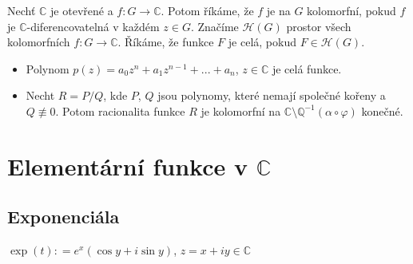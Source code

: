 
\begin{definition}
Nechť $\mathbb{C}$ je otevřené a $f \colon G \to \mathbb{C}$.
Potom říkáme, že $f$ je na $G$ kolomorfní, pokud $f$ je  $\mathbb{C}$-diferencovatelná v každém $z\in {G}$. Značíme $\mathcal{H}(G)$ prostor všech kolomorfních $f \colon G \to \mathbb{C}$. Říkáme, že funkce $F$ je celá, pokud $F\in \mathcal{H}(G)$.
\end{definition}

\begin{example}
\begin{itemize}
    \item Polynom $p(z) = a_0z^{n}+a_1z^{n-1}+...+a_n$, $z\in \mathbb{C}$ je celá funkce.
    \item Necht $R=P/Q$, kde $P$, $Q$ jsou polynomy, které nemají společné kořeny a $Q\not\equiv 0$. Potom racionalita funkce $R$ je kolomorfní na $\mathbb{C}\setminus\mathbb{Q}^{-1}(\alpha\circ\varphi)$ konečné.
\end{itemize}    
\end{example}


\section{Elementární funkce v $\mathbb{C}$}
\subsection{Exponenciála}

\begin{definition}
$\exp(t)\colon=e^{x}(\cos y + i\sin y)$, $z=x+i y\in \mathbb{C}$
\end{definition}

